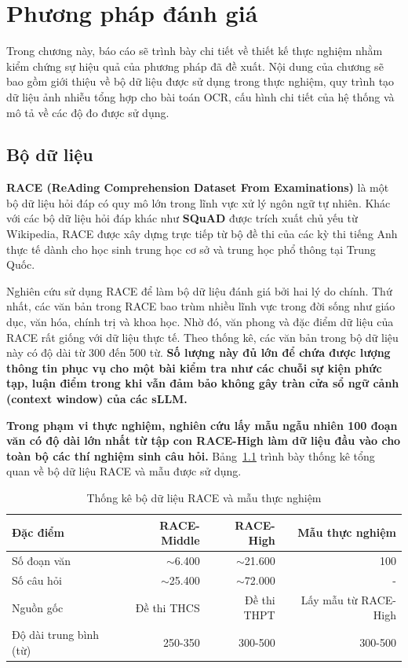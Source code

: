 \chapter{Phương pháp đánh giá}
\label{chap:phuong-phap-danh-gia}

Trong chương này, báo cáo sẽ trình bày chi tiết về thiết kế thực nghiệm nhằm kiểm chứng sự hiệu quả của phương pháp đã đề xuất. Nội dung của chương sẽ bao gồm giới thiệu về bộ dữ liệu được sử dụng trong thực nghiệm, quy trình tạo dữ liệu ảnh nhiễu tổng hợp cho bài toán OCR, cấu hình chi tiết của hệ thống và mô tả về các độ đo được sử dụng.

\section{Bộ dữ liệu}

\textbf{RACE (ReAding Comprehension Dataset From Examinations)} \cite{lai2017race} là một bộ dữ liệu hỏi đáp có quy mô lớn trong lĩnh vực xử lý ngôn ngữ tự nhiên. Khác với các bộ dữ liệu hỏi đáp khác như \textbf{SQuAD} \cite{rajpurkar2016squad} được trích xuất chủ yếu từ Wikipedia, RACE được xây dựng trực tiếp từ bộ đề thi của các kỳ thi tiếng Anh thực tế dành cho học sinh trung học cơ sở và trung học phổ thông tại Trung Quốc.

Nghiên cứu sử dụng RACE để làm bộ dữ liệu đánh giá bởi hai lý do chính. Thứ nhất, các văn bản trong RACE bao trùm nhiều lĩnh vực trong đời sống như giáo dục, văn hóa, chính trị và khoa học. Nhờ đó, văn phong và đặc điểm dữ liệu của RACE rất giống với dữ liệu thực tế. Theo thống kê, các văn bản trong bộ dữ liệu này có độ dài từ 300 đến 500 từ. \textbf{Số lượng này đủ lớn để chứa được lượng thông tin phục vụ cho một bài kiểm tra như các chuỗi sự kiện phức tạp, luận điểm trong khi vẫn đảm bảo không gây tràn cửa sổ ngữ cảnh (context window) của các sLLM.}

\textbf{Trong phạm vi thực nghiệm, nghiên cứu lấy mẫu ngẫu nhiên 100 đoạn văn có độ dài lớn nhất từ tập con RACE-High làm dữ liệu đầu vào cho toàn bộ các thí nghiệm sinh câu hỏi.} Bảng~\ref{tab:race_stats} trình bày thống kê tổng quan về bộ dữ liệu RACE và mẫu được sử dụng.

\begin{table}[htbp]
\centering
\begin{tabular}{lrrr}
\toprule
\textbf{Đặc điểm} & \textbf{RACE-Middle} & \textbf{RACE-High} & \textbf{Mẫu thực nghiệm} \\
\midrule
Số đoạn văn & $\sim$6.400 & $\sim$21.600 & 100 \\
Số câu hỏi & $\sim$25.400 & $\sim$72.000 & - \\
Nguồn gốc & Đề thi THCS & Đề thi THPT & Lấy mẫu từ RACE-High \\
Độ dài trung bình (từ) & 250-350 & 300-500 & 300-500 \\
\bottomrule
\end{tabular}
\caption{Thống kê bộ dữ liệu RACE và mẫu thực nghiệm}
\label{tab:race_stats}
\end{table}

